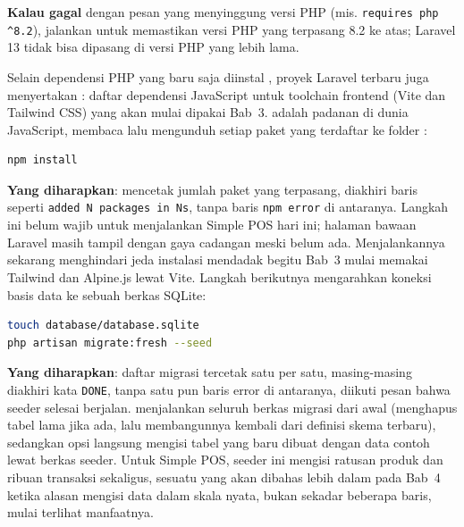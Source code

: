 \begin{tipbox}
\textbf{Kalau  gagal} dengan pesan yang
menyinggung versi PHP (mis. \texttt{requires php \textasciicircum{}8.2}),
jalankan
 untuk memastikan versi PHP yang terpasang 8.2 ke atas;
Laravel 13 tidak bisa dipasang di versi PHP yang lebih lama.
\end{tipbox}

Selain dependensi PHP yang baru saja diinstal , proyek Laravel
terbaru juga menyertakan : daftar dependensi JavaScript
untuk toolchain frontend (Vite dan Tailwind CSS) yang akan mulai dipakai
Bab~3.  adalah padanan  di dunia
JavaScript, membaca  lalu mengunduh setiap paket yang
terdaftar ke folder :

\begin{lstlisting}[language=bash]
npm install
\end{lstlisting}

\textbf{Yang diharapkan}:  mencetak jumlah paket yang
terpasang, diakhiri baris seperti \texttt{added N packages in Ns}, tanpa
baris \texttt{npm error} di antaranya. Langkah ini belum wajib untuk
menjalankan Simple POS hari ini; halaman bawaan Laravel masih tampil
dengan gaya cadangan meski  belum ada.
Menjalankannya sekarang menghindari jeda instalasi mendadak begitu Bab~3
mulai memakai Tailwind dan Alpine.js lewat Vite. Langkah berikutnya
mengarahkan koneksi basis data ke sebuah berkas SQLite:

\begin{lstlisting}[language=bash]
touch database/database.sqlite
php artisan migrate:fresh --seed
\end{lstlisting}

\textbf{Yang diharapkan}: daftar migrasi tercetak satu per satu, masing-masing
diakhiri kata \texttt{DONE}, tanpa satu pun baris error di antaranya,
diikuti pesan bahwa seeder selesai berjalan. 
menjalankan seluruh berkas migrasi dari awal (menghapus tabel lama jika
ada, lalu membangunnya kembali dari definisi skema terbaru), sedangkan
opsi  langsung mengisi tabel yang baru dibuat dengan data
contoh lewat berkas seeder. Untuk Simple POS, seeder ini mengisi ratusan
produk dan ribuan transaksi sekaligus, sesuatu yang akan dibahas lebih
dalam pada Bab~4 ketika alasan mengisi data dalam skala nyata, bukan
sekadar beberapa baris, mulai terlihat manfaatnya.

